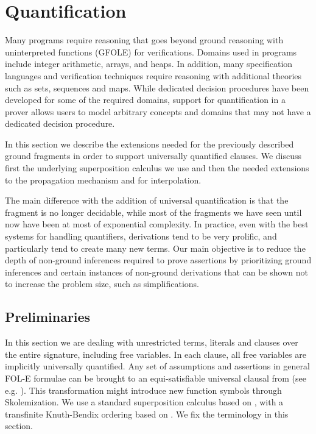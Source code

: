 \chapter{Quantification}\label{chapter:quantification}
Many programs require reasoning that goes beyond ground reasoning with uninterpreted functions (GFOLE) for verifications.
Domains used in programs include integer arithmetic, arrays, and heaps. 
In addition, many specification languages and verification techniques require reasoning with additional theories such as sets, sequences and maps.
While dedicated decision procedures have been developed for some of the required domains, support for quantification in a prover allows users to model arbitrary concepts and domains that may not have a dedicated decision procedure.

In this section we describe the extensions needed for the previously described ground fragments in order to support universally quantified clauses.
We discuss first the underlying superposition calculus we use and then the needed extensions to the propagation mechanism and for interpolation.

The main difference with the addition of universal quantification is that the fragment is no longer decidable, while most of the fragments we have seen until now have been at most of exponential complexity. 
In practice, even with the best systems for handling quantifiers, derivations tend to be very prolific, 
and particularly tend to create many new terms.
Our main objective is to reduce the depth of non-ground inferences required to prove assertions by prioritizing ground inferences and certain instances of non-ground derivations that can be shown not to increase the problem size, such as simplifications.

\section{Preliminaries}
In this section we are dealing with unrestricted terms, literals and clauses over the entire signature, including free variables.
In each clause, all free variables are implicitly universally quantified. Any set of assumptions and assertions in general FOL-E formulae can be brought to an equi-satisfiable universal clausal from (see e.g. \cite{Baaz2001273}). This transformation might introduce new function symbols through Skolemization. 
We use a standard superposition calculus based on \cite{BachmairGanzingerSuperposition}, with a transfinite Knuth-Bendix ordering based on \cite{KovacsMoserVoronkov11}. We fix the terminology in this section.

